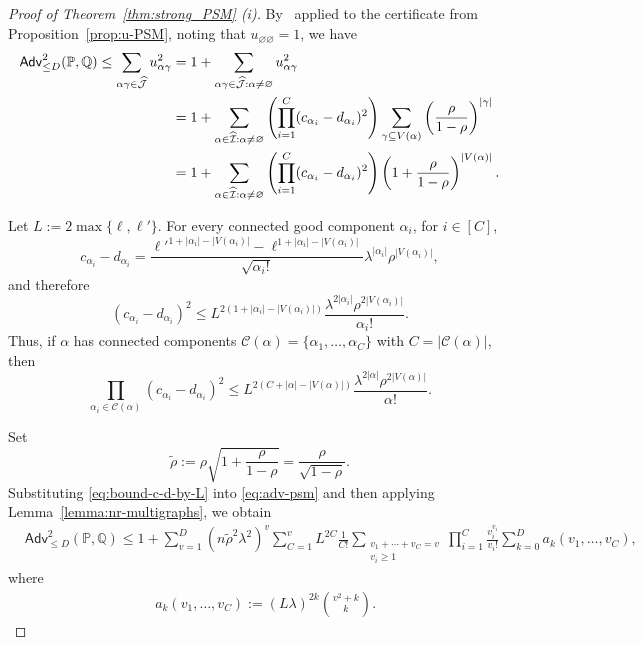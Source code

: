 \documentclass[11pt, letterpaper]{article}
\numberwithin{equation}{section}
\newcommand{\Adv}{\mathsf{Adv}}
\newcommand{\PP}{\mathbb{P}}
\newcommand{\QQ}{\mathbb{Q}}
\newcommand{\goodJ}{\widehat{\mathcal{J}}}
\begin{document}
\begin{proof}[Proof of Theorem~\ref{thm:strong_PSM} \textnormal{(i)}]
By~ applied to the certificate from Proposition~\ref{prop:u-PSM}, noting that $u_{\varnothing\varnothing}=1$, we have
 \begin{align}
\notag \Adv_{\le D}^2(\PP,\QQ)
\notag \leq \sum_{\alpha\gamma\in\goodJ} u_{\alpha\gamma}^2&=1+
\sum_{\alpha\gamma\in\widehat{\mathcal J}:\alpha\neq\varnothing}
u_{\alpha\gamma}^2 \\
\notag &=
1+
\sum_{\alpha\in\widehat{\mathcal I}:\alpha\neq\varnothing}
\left(\prod_{i=1}^C
(c_{\alpha_i}-d_{\alpha_i})^2\right)
\sum_{\gamma\subseteq V(\alpha)}
\left(\frac{\rho}{1-\rho}\right)^{|\gamma|} \\
&=
1+
\sum_{\alpha\in\widehat{\mathcal I}:\alpha\neq\varnothing}
\left(\prod_{i=1}^C
(c_{\alpha_i}-d_{\alpha_i})^2\right)
\left(1+\frac{\rho}{1-\rho}\right)^{|V(\alpha)|}.\label{eq:adv-psm}
\end{align}

\noindent Let $L:=2\max\{\ell,\ell'\}$. For every connected good component $\alpha_i$, for $i\in [C]$,
\[
c_{\alpha_i}-d_{\alpha_i}
=
\frac{
\ell'^{1+|\alpha_i|-|V(\alpha_i)|}
-
\ell^{1+|\alpha_i|-|V(\alpha_i)|}
}{\sqrt{\alpha_i!}}
\lambda^{|\alpha_i|}\rho^{|V(\alpha_i)|},
\]
and therefore
\[
(c_{\alpha_i}-d_{\alpha_i})^2
\leq
L^{2(1+|\alpha_i|-|V(\alpha_i)|)}
\frac{\lambda^{2|\alpha_i|}\rho^{2|V(\alpha_i)|}}{\alpha_i!}.
\]
Thus, if $\alpha$ has connected components
$\mathcal{C}(\alpha)=\{\alpha_1,\dots,\alpha_C\}$ with $C=|\mathcal C (\alpha)|$, then
\begin{equation}\label{eq:bound-c-d-by-L}
\prod_{\alpha_i\in\mathcal{C}(\alpha)}(c_{\alpha_i}-d_{\alpha_i})^2
\leq
L^{2(C+|\alpha|-|V(\alpha)|)}
\frac{\lambda^{2|\alpha|}\rho^{2|V(\alpha)|}}{\alpha!}.
\end{equation}

\noindent Set $$\tilde{\rho}:=\rho\sqrt{1+\frac{\rho}{1-\rho}}=\frac{\rho}{\sqrt{1-\rho}}.$$ Substituting \eqref{eq:bound-c-d-by-L} into \eqref{eq:adv-psm} and then applying Lemma~\ref{lemma:nr-multigraphs}, we obtain 
   \begin{align*}
&\Adv_{\leq D}^2(\PP,\QQ)\leq
1+
\sum_{v=1}^{D}
({ n}\tilde{\rho}^2\lambda^2)^{v}
\sum_{C=1}^{v}
L^{2C}\frac{1}{C!}
\sum_{\substack{v_1+\cdots+v_C=v\\ v_i\ge 1}}
\prod_{i=1}^C\frac{v_i^{v_i}}{v_i!}
\sum_{k=0}^{D} a_k(v_1,\dots,v_C),
\end{align*}
where
\begin{align*}
&a_k(v_1,\dots,v_C)
:=
(L\lambda)^{2k}
\binom{v^2+k}{k}.
\end{align*}
 

\end{proof}
\end{document}
